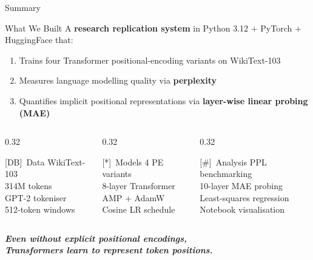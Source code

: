 \documentclass[aspectratio=169, 10pt]{beamer}
\newcommand{\faDatabase}{[DB]\ }
\newcommand{\faCogs}{[*]\ }
\newcommand{\faChartLine}{[\#]\ }
\begin{document}
\begin{frame}{Summary}
  \begin{block}{What We Built}
    A \textbf{research replication system} in Python 3.12 + PyTorch + HuggingFace that:
    \begin{enumerate}
      \item Trains four Transformer positional-encoding variants on WikiText-103
      \item Measures language modelling quality via \textbf{perplexity}
      \item Quantifies implicit positional representations via \textbf{layer-wise linear probing (MAE)}
    \end{enumerate}
  \end{block}
  \vspace{0.5em}
  \begin{columns}
    \begin{column}{0.32\textwidth}
      \begin{block}{\faDatabase Data}
        WikiText-103\\
        314M tokens\\
        GPT-2 tokeniser\\
        512-token windows
      \end{block}
    \end{column}
    \begin{column}{0.32\textwidth}
      \begin{block}{\faCogs Models}
        4 PE variants\\
        8-layer Transformer\\
        AMP + AdamW\\
        Cosine LR schedule
      \end{block}
    \end{column}
    \begin{column}{0.32\textwidth}
      \begin{block}{\faChartLine Analysis}
        PPL benchmarking\\
        10-layer MAE probing\\
        Least-squares regression\\
        Notebook visualisation
      \end{block}
    \end{column}
  \end{columns}
  \vspace{0.8em}
  \begin{center}
    \Large\textbf{\textit{Even without explicit positional encodings,\\
    Transformers learn to represent token positions.}}
  \end{center}
\end{frame}
\end{document}
